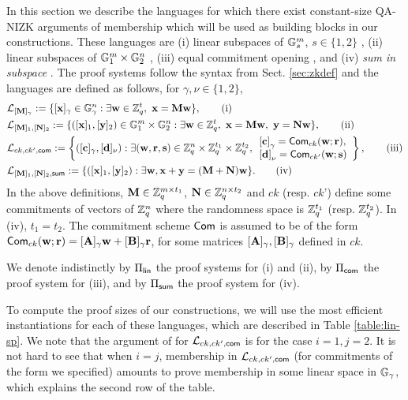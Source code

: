 In this section we describe the languages for which there exist constant-size QA-NIZK arguments of membership which will be used as building blocks in our constructions.  These languages are (i) linear subspaces of $\mathbb{G}_s^m$, $s \in \{1,2\}$ \cite{C:JutRoy14,EC:KilWee15,EC:LPJY14}, (ii) linear subspaces of $\mathbb{G}_1^m\times\mathbb{G}_2^n$ \cite{AC:GonHevRaf15}, (iii) equal commitment opening \cite{AC:GonHevRaf15}, and (iv) \emph{sum in subspace} \cite{AC:GonHevRaf15}. The proof systems follow the syntax from Sect. \ref{sec:zkdef} and the languages are defined as follows, for $\gamma,\nu \in \{1,2\}$, 
\begin{align}
&\mathcal{L}_{[\mathbf{{M}}]_\gamma}:=\{ [\mathbf{x}]_{\gamma} \in \mathbb{G}_{\gamma}^{n}:  \exists \mathbf{w} \in \mathbb{Z}_q^{t}, \  \mathbf{x}=\mathbf{{M}}\mathbf{w} \}, \tag{i}\\
&\mathcal{L}_{[\mathbf{{M}}]_1,[\mathbf{{N}}]_2}:=\{ ([\mathbf{x}]_1,[\mathbf{y}]_2) \in \mathbb{G}_1^{m}\times\mathbb{G}_2^n:  \exists \mathbf{w} \in \mathbb{Z}_q^{t}, \  \mathbf{x}=\mathbf{{M}}\mathbf{w}, \   \mathbf{y}=\mathbf{{N}}\mathbf{w} \}, \tag{ii}\\
&\mathcal{L}_{ck,ck',\mathsf{com}}:=\left\{([\mathbf{c}]_\gamma,[\mathbf{d}]_\nu):\exists (\mathbf{w}, \mathbf{r},\mathbf{s}) 
\in \mathbb{Z}_q^n \times \mathbb{Z}_q^{t_1} \times \mathbb{Z}_q^{t_2},  
\begin{array}{l}
    {[\mathbf{c}]}_\gamma=\mathsf{Com}_{ck}(\mathbf{w};\mathbf{r}),\\
    {[\mathbf{d}]}_\nu=\mathsf{Com}_{ck'}(\mathbf{w};\mathbf{s})
\end{array}
\right\}, \tag{iii}\\
&\mathcal{L}_{[\mathbf{{M}}]_1,[\mathbf{{N}}]_2,\mathsf{sum}}:=\{([\mathbf{x}]_1,[\mathbf{y}]_2):\exists\mathbf{w}, \mathbf{x}+\mathbf{y}=(\mathbf{{M}}+\mathbf{{N}})\mathbf{w}\}. \tag{iv}
\end{align}
In the above definitions, $\mathbf{{M}} \in \mathbb{Z}_q^{m \times t_1}$,
  $\mathbf{{N}} \in \mathbb{Z}_q^{n \times t_2}$ and $ck$ (resp. $ck$') define some commitments of vectors of $\mathbb{Z}_q^{n}$ where the randomness space is $\mathbb{Z}_q^{t_1}$ (resp. $\mathbb{Z}_q^{t_2}$). In (iv), $t_1=t_2$. The commitment scheme $\mathsf{Com}$ is assumed to be of the form 
 $\mathsf{Com}_{ck}(\mathbf{w};\mathbf{r})=[\mathbf{{A}}]_\gamma \mathbf{w}+[\mathbf{{B}}]_\gamma \mathbf{r}$, 
 for some matrices $[\mathbf{{A}}]_\gamma,[\mathbf{{B}}]_\gamma$ defined in 
  $ck$. 

We denote indistinctly by $\Pi_{\mathsf{lin}}$ the proof systems for (i) and (ii), by $\Pi_{\mathsf{com}}$ the proof system for (iii), and by $\Pi_{\mathsf{sum}}$ the proof system for (iv).

 To compute the proof sizes of our constructions, we will use the most efficient instantiations for each of these languages, which are described in Table \ref{table:lin-sp}. We note that the argument of \cite{AC:GonHevRaf15} for $\mathcal{L}_{ck,ck',\mathsf{com}}$ is for the case $i=1,j=2$. It is not hard to see that when $i=j$, membership in $\mathcal{L}_{ck,ck',\mathsf{com}}$ (for commitments of the form we specified) amounts to prove membership in some linear space in $\mathbb{G}_\gamma$, which explains the second row of the table.

